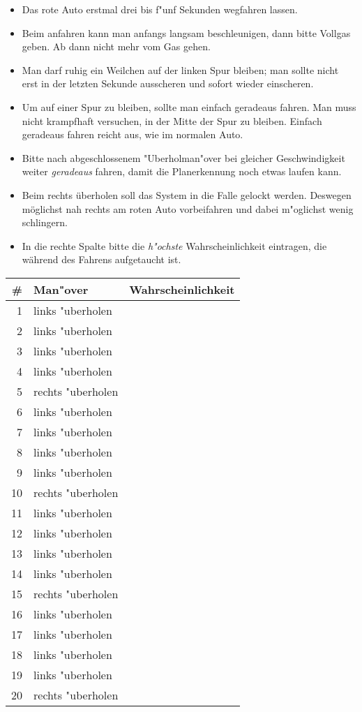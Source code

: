 \documentclass[a4paper,10pt]{scrartcl}
\begin{document}
\begin{itemize}
\item Das rote Auto erstmal drei bis f"unf Sekunden wegfahren lassen.
\item Beim anfahren kann man anfangs langsam beschleunigen, dann bitte
        Vollgas geben. Ab dann nicht mehr vom Gas gehen.
\item Man darf ruhig ein Weilchen auf der linken Spur bleiben; man
        sollte nicht erst in der letzten Sekunde ausscheren und sofort
        wieder einscheren.
\item Um auf einer Spur zu bleiben, sollte man einfach geradeaus
        fahren. Man muss nicht krampfhaft versuchen, in der Mitte
        der Spur zu bleiben. Einfach geradeaus fahren reicht aus,
        wie im normalen Auto.
\item Bitte nach abgeschlossenem "Uberholman"over bei gleicher
        Geschwindigkeit weiter {\em geradeaus} fahren, damit die
        Planerkennung noch etwas laufen kann.
\item Beim rechts \"uberholen soll das System in die Falle gelockt
        werden. Deswegen m\"oglichst nah rechts am roten Auto
        vorbeifahren und dabei m"oglichst wenig schlingern.
\item In die rechte Spalte bitte die {\em h"ochste} Wahrscheinlichkeit
        eintragen, die w\"ahrend des Fahrens aufgetaucht ist.
\end{itemize}

\begin{center}
\begin{tabular}{|r|l|r|}
\hline
\bf \# & \bf Man"over & \bf Wahrscheinlichkeit\\ \hline
1 & links "uberholen & \\ \hline
2 & links "uberholen & \\ \hline
3 & links "uberholen & \\ \hline
4 & links "uberholen & \\ \hline
5 & rechts "uberholen & \\ \hline
6 & links "uberholen & \\ \hline
7 & links "uberholen & \\ \hline
8 & links "uberholen & \\ \hline
9 & links "uberholen & \\ \hline
10 & rechts "uberholen & \\ \hline
11 & links "uberholen & \\ \hline
12 & links "uberholen & \\ \hline
13 & links "uberholen & \\ \hline
14 & links "uberholen & \\ \hline
15 & rechts "uberholen & \\ \hline
16 & links "uberholen & \\ \hline
17 & links "uberholen & \\ \hline
18 & links "uberholen & \\ \hline
19 & links "uberholen & \\ \hline
20 & rechts "uberholen & \\ \hline
\end{tabular}
\end{center}
\end{document}
